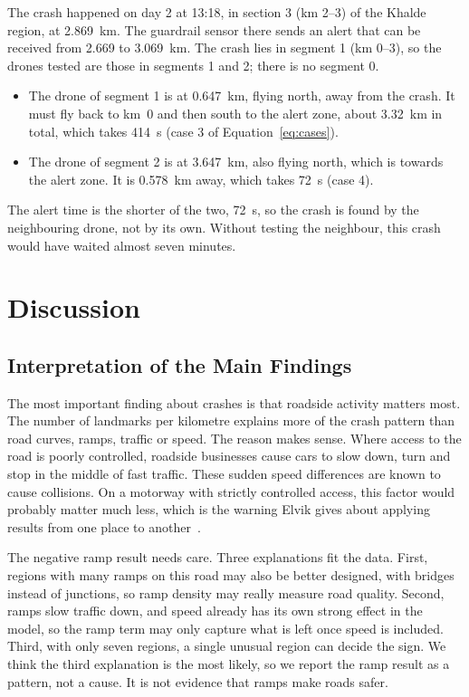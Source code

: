 \documentclass[11pt]{article}
\begin{document}
The crash happened on day 2 at 13:18, in section 3 (km 2--3) of the Khalde
region, at 2.869~km. The guardrail sensor there sends an alert that can be
received from 2.669 to 3.069~km. The crash lies in segment 1 (km 0--3), so the
drones tested are those in segments 1 and 2; there is no segment 0.

\begin{itemize}[leftmargin=*,itemsep=2pt]
\item The drone of segment 1 is at 0.647~km, flying north, away from the crash.
It must fly back to km~0 and then south to the alert zone, about 3.32~km in
total, which takes 414~s (case 3 of Equation~\eqref{eq:cases}).
\item The drone of segment 2 is at 3.647~km, also flying north, which is towards
the alert zone. It is 0.578~km away, which takes 72~s (case 4).
\end{itemize}

The alert time is the shorter of the two, 72~s, so the crash is found by the
neighbouring drone, not by its own. Without testing the neighbour, this crash
would have waited almost seven minutes.

\section{Discussion}
\label{sec:discussion}

\subsection{Interpretation of the Main Findings}

The most important finding about crashes is that roadside activity matters
most. The number of landmarks per kilometre explains more of the crash pattern
than road curves, ramps, traffic or speed. The reason makes sense. Where access
to the road is poorly controlled, roadside businesses cause cars to slow down,
turn and stop in the middle of fast traffic. These sudden speed differences are
known to cause collisions. On a motorway with strictly controlled access, this
factor would probably matter much less, which is the warning Elvik gives about
applying results from one place to another~\cite{elvik2013}.

The negative ramp result needs care. Three explanations fit the data. First,
regions with many ramps on this road may also be better designed, with bridges
instead of junctions, so ramp density may really measure road quality. Second,
ramps slow traffic down, and speed already has its own strong effect in the
model, so the ramp term may only capture what is left once speed is included.
Third, with only seven regions, a single unusual region can decide the sign.
We think the third explanation is the most likely, so we report the ramp result
as a pattern, not a cause. It is not evidence that ramps make roads safer.
\end{document}
